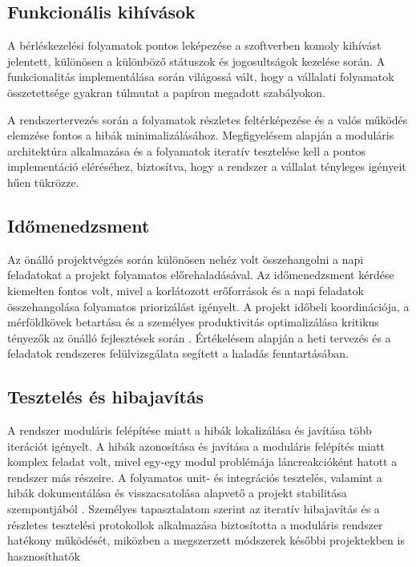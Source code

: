 \subsection{Funkcionális kihívások}

A bérléskezelési folyamatok pontos leképezése a szoftverben komoly kihívást jelentett, különösen a különböző státuszok és jogosultságok kezelése során.  
A funkcionalitás implementálása során világossá vált, hogy a vállalati folyamatok összetettsége gyakran túlmutat a papíron megadott szabályokon.  

A rendszertervezés során a folyamatok részletes feltérképezése és a valós működés elemzése fontos a hibák minimalizálásához.  
Megfigyelésem alapján a moduláris architektúra alkalmazása és a folyamatok iteratív tesztelése kell a pontos implementáció eléréséhez, biztosítva, hogy a rendszer a vállalat tényleges igényeit hűen tükrözze.

\subsection{Időmenedzsment}

Az önálló projektvégzés során különösen nehéz volt összehangolni a napi feladatokat a projekt folyamatos előrehaladásával.
Az időmenedzsment kérdése kiemelten fontos volt, mivel a korlátozott erőforrások és a napi feladatok összehangolása 
folyamatos priorizálást igényelt. A projekt időbeli koordinációja, 
a mérföldkövek betartása és a személyes produktivitás optimalizálása kritikus tényezők az önálló fejlesztések során \cite{Kaposi2019,Kovacs2016}. 
Értékelésem alapján a heti tervezés és a feladatok rendszeres felülvizsgálata segített a haladás fenntartásában.

\subsection{Tesztelés és hibajavítás}

A rendszer moduláris felépítése miatt a hibák lokalizálása és javítása több iterációt igényelt.
A hibák azonosítása és javítása a moduláris felépítés miatt komplex feladat volt, mivel egy-egy modul problémája 
láncreakcióként hatott a rendszer más részeire. A folyamatos unit- és integrációs 
tesztelés, valamint a hibák dokumentálása és visszacsatolása alapvető a projekt stabilitása szempontjából \cite{Hajdu2014,Szalay2018}. 
Személyes tapasztalatom szerint az iteratív hibajavítás és a részletes tesztelési protokollok alkalmazása biztosította 
a moduláris rendszer hatékony működését, miközben a megszerzett módszerek későbbi projektekben is hasznosíthatók
